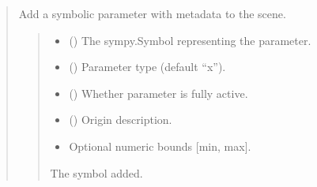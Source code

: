 \documentclass[letterpaper,10pt,english]{sphinxmanual}
\begin{document}
\begin{quote}
\begin{fulllineitems}
\begin{fulllineitems}
\label{\detokenize{pygeox:pygeox.geoscene.GeoScene.add_parameter}}
\pysigstartsignatures
\pysiglinewithargsret
{}
{\sphinxparamcomma {}\sphinxparamcomma {}\sphinxparamcomma {}\sphinxparamcomma {}}
{}
\pysigstopsignatures
\sphinxAtStartPar
Add a symbolic parameter with metadata to the scene.
\begin{quote}\begin{description}
\begin{itemize}
\item {} 
\sphinxAtStartPar
{} () \textendash{} The sympy.Symbol representing the parameter.

\item {} 
\sphinxAtStartPar
{} () \textendash{} Parameter type (default “x”).

\item {} 
\sphinxAtStartPar
{} () \textendash{} Whether parameter is fully active.

\item {} 
\sphinxAtStartPar
{} () \textendash{} Origin description.

\item {} 
\sphinxAtStartPar
{} \textendash{} Optional numeric bounds {[}min, max{]}.

\end{itemize}

\sphinxAtStartPar
The symbol added.

\end{description}\end{quote}

\end{fulllineitems}


\end{fulllineitems}
\end{quote}
\end{document}

